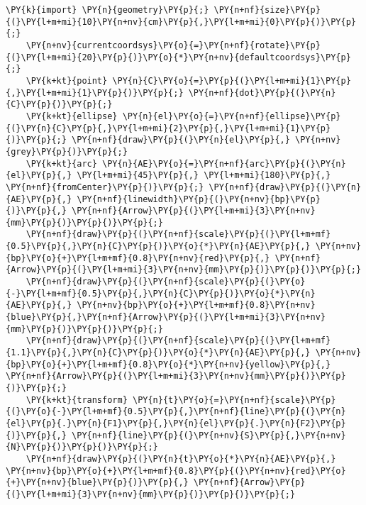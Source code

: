 \begin{Verbatim}[commandchars=\\\{\}]
    \PY{k}{import} \PY{n}{geometry}\PY{p}{;} \PY{n+nf}{size}\PY{p}{(}\PY{l+m+mi}{10}\PY{n+nv}{cm}\PY{p}{,}\PY{l+m+mi}{0}\PY{p}{)}\PY{p}{;}
    \PY{n+nv}{currentcoordsys}\PY{o}{=}\PY{n+nf}{rotate}\PY{p}{(}\PY{l+m+mi}{20}\PY{p}{)}\PY{o}{*}\PY{n+nv}{defaultcoordsys}\PY{p}{;}
    \PY{k+kt}{point} \PY{n}{C}\PY{o}{=}\PY{p}{(}\PY{l+m+mi}{1}\PY{p}{,}\PY{l+m+mi}{1}\PY{p}{)}\PY{p}{;} \PY{n+nf}{dot}\PY{p}{(}\PY{n}{C}\PY{p}{)}\PY{p}{;}
    \PY{k+kt}{ellipse} \PY{n}{el}\PY{o}{=}\PY{n+nf}{ellipse}\PY{p}{(}\PY{n}{C}\PY{p}{,}\PY{l+m+mi}{2}\PY{p}{,}\PY{l+m+mi}{1}\PY{p}{)}\PY{p}{;} \PY{n+nf}{draw}\PY{p}{(}\PY{n}{el}\PY{p}{,} \PY{n+nv}{grey}\PY{p}{)}\PY{p}{;}
    \PY{k+kt}{arc} \PY{n}{AE}\PY{o}{=}\PY{n+nf}{arc}\PY{p}{(}\PY{n}{el}\PY{p}{,} \PY{l+m+mi}{45}\PY{p}{,} \PY{l+m+mi}{180}\PY{p}{,} \PY{n+nf}{fromCenter}\PY{p}{)}\PY{p}{;} \PY{n+nf}{draw}\PY{p}{(}\PY{n}{AE}\PY{p}{,} \PY{n+nf}{linewidth}\PY{p}{(}\PY{n+nv}{bp}\PY{p}{)}\PY{p}{,} \PY{n+nf}{Arrow}\PY{p}{(}\PY{l+m+mi}{3}\PY{n+nv}{mm}\PY{p}{)}\PY{p}{)}\PY{p}{;}
    \PY{n+nf}{draw}\PY{p}{(}\PY{n+nf}{scale}\PY{p}{(}\PY{l+m+mf}{0.5}\PY{p}{,}\PY{n}{C}\PY{p}{)}\PY{o}{*}\PY{n}{AE}\PY{p}{,} \PY{n+nv}{bp}\PY{o}{+}\PY{l+m+mf}{0.8}\PY{n+nv}{red}\PY{p}{,} \PY{n+nf}{Arrow}\PY{p}{(}\PY{l+m+mi}{3}\PY{n+nv}{mm}\PY{p}{)}\PY{p}{)}\PY{p}{;}
    \PY{n+nf}{draw}\PY{p}{(}\PY{n+nf}{scale}\PY{p}{(}\PY{o}{-}\PY{l+m+mf}{0.5}\PY{p}{,}\PY{n}{C}\PY{p}{)}\PY{o}{*}\PY{n}{AE}\PY{p}{,} \PY{n+nv}{bp}\PY{o}{+}\PY{l+m+mf}{0.8}\PY{n+nv}{blue}\PY{p}{,}\PY{n+nf}{Arrow}\PY{p}{(}\PY{l+m+mi}{3}\PY{n+nv}{mm}\PY{p}{)}\PY{p}{)}\PY{p}{;}
    \PY{n+nf}{draw}\PY{p}{(}\PY{n+nf}{scale}\PY{p}{(}\PY{l+m+mf}{1.1}\PY{p}{,}\PY{n}{C}\PY{p}{)}\PY{o}{*}\PY{n}{AE}\PY{p}{,} \PY{n+nv}{bp}\PY{o}{+}\PY{l+m+mf}{0.8}\PY{o}{*}\PY{n+nv}{yellow}\PY{p}{,} \PY{n+nf}{Arrow}\PY{p}{(}\PY{l+m+mi}{3}\PY{n+nv}{mm}\PY{p}{)}\PY{p}{)}\PY{p}{;}
    \PY{k+kt}{transform} \PY{n}{t}\PY{o}{=}\PY{n+nf}{scale}\PY{p}{(}\PY{o}{-}\PY{l+m+mf}{0.5}\PY{p}{,}\PY{n+nf}{line}\PY{p}{(}\PY{n}{el}\PY{p}{.}\PY{n}{F1}\PY{p}{,}\PY{n}{el}\PY{p}{.}\PY{n}{F2}\PY{p}{)}\PY{p}{,} \PY{n+nf}{line}\PY{p}{(}\PY{n+nv}{S}\PY{p}{,}\PY{n+nv}{N}\PY{p}{)}\PY{p}{)}\PY{p}{;}
    \PY{n+nf}{draw}\PY{p}{(}\PY{n}{t}\PY{o}{*}\PY{n}{AE}\PY{p}{,} \PY{n+nv}{bp}\PY{o}{+}\PY{l+m+mf}{0.8}\PY{p}{(}\PY{n+nv}{red}\PY{o}{+}\PY{n+nv}{blue}\PY{p}{)}\PY{p}{,} \PY{n+nf}{Arrow}\PY{p}{(}\PY{l+m+mi}{3}\PY{n+nv}{mm}\PY{p}{)}\PY{p}{)}\PY{p}{;}
\end{Verbatim}
